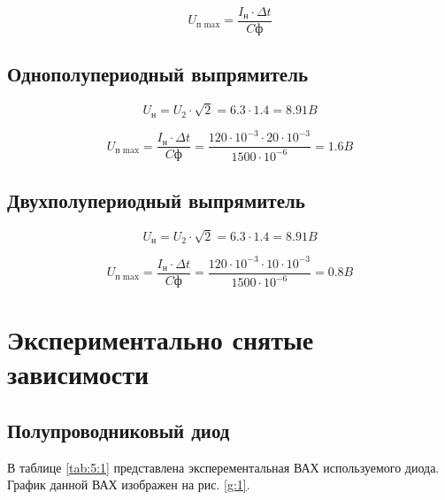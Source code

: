 \begin{equation}
U_\text{п max} = \frac{I_\text{н} \cdot \Delta t}{C\text{ф}}
\end{equation}

\subsection{Однополупериодный выпрямитель}

\begin{displaymath}
U_\text{н} = U_2 \cdot \sqrt{2} = 6.3 \cdot 1.4 = 8.91 B
\end{displaymath}

\begin{displaymath}
U_\text{п max} = \frac{I_\text{н} \cdot \Delta t}{C\text{ф}} = \frac{120 \cdot 10^{-3}\cdot 20 \cdot 10^{-3}}{1500 \cdot 10^{-6}} = 1.6 B
\end{displaymath}

\subsection{Двухполупериодный выпрямитель}

\begin{displaymath}
U_\text{н} = U_2 \cdot \sqrt{2} = 6.3 \cdot 1.4 = 8.91 B
\end{displaymath}

\begin{displaymath}
U_\text{п max} = \frac{I_\text{н} \cdot \Delta t}{C\text{ф}} = \frac{120 \cdot 10^{-3}\cdot 10 \cdot 10^{-3}}{1500 \cdot 10^{-6}} = 0.8 B
\end{displaymath}

\section{Экспериментально снятые зависимости}

\subsection{Полупроводниковый диод}

В таблице \ref{tab:5:1} представлена эксперементальная ВАХ используемого диода. График данной ВАХ изображен на рис. \ref{g:1}.

